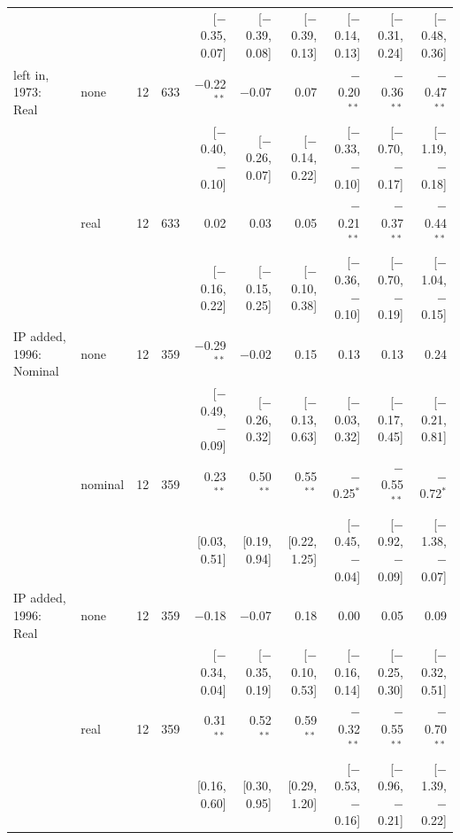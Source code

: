 \begin{table}[tp]
{\begin{tabular}{llcrrrrrrr}
 & & & & {\scriptsize [$-$0.35, 0.07]} & {\scriptsize [$-$0.39, 0.08]} & {\scriptsize [$-$0.39, 0.13]} & {\scriptsize [$-$0.14, 0.13]} & {\scriptsize [$-$0.31, 0.24]} & {\scriptsize [$-$0.48, 0.36]}\\
\addlinespace
2020 left in, 1973: Real & none & 12 & 633 & $-$0.22$^{**}$ & $-$0.07 & 0.07 & $-$0.20$^{**}$ & $-$0.36$^{**}$ & $-$0.47$^{**}$\\
 & & & & {\scriptsize [$-$0.40, $-$0.10]} & {\scriptsize [$-$0.26, 0.07]} & {\scriptsize [$-$0.14, 0.22]} & {\scriptsize [$-$0.33, $-$0.10]} & {\scriptsize [$-$0.70, $-$0.17]} & {\scriptsize [$-$1.19, $-$0.18]}\\
 & real & 12 & 633 & 0.02 & 0.03 & 0.05 & $-$0.21$^{**}$ & $-$0.37$^{**}$ & $-$0.44$^{**}$\\
 & & & & {\scriptsize [$-$0.16, 0.22]} & {\scriptsize [$-$0.15, 0.25]} & {\scriptsize [$-$0.10, 0.38]} & {\scriptsize [$-$0.36, $-$0.10]} & {\scriptsize [$-$0.70, $-$0.19]} & {\scriptsize [$-$1.04, $-$0.15]}\\
\addlinespace
IP added, 1996: Nominal & none & 12 & 359 & $-$0.29$^{**}$ & $-$0.02 & 0.15 & 0.13 & 0.13 & 0.24\\
 & & & & {\scriptsize [$-$0.49, $-$0.09]} & {\scriptsize [$-$0.26, 0.32]} & {\scriptsize [$-$0.13, 0.63]} & {\scriptsize [$-$0.03, 0.32]} & {\scriptsize [$-$0.17, 0.45]} & {\scriptsize [$-$0.21, 0.81]}\\
 & nominal & 12 & 359 & 0.23$^{**}$ & 0.50$^{**}$ & 0.55$^{**}$ & $-$0.25$^{*}$ & $-$0.55$^{**}$ & $-$0.72$^{*}$\\
 & & & & {\scriptsize [0.03, 0.51]} & {\scriptsize [0.19, 0.94]} & {\scriptsize [0.22, 1.25]} & {\scriptsize [$-$0.45, $-$0.04]} & {\scriptsize [$-$0.92, $-$0.09]} & {\scriptsize [$-$1.38, $-$0.07]}\\
\addlinespace
IP added, 1996: Real & none & 12 & 359 & $-$0.18 & $-$0.07 & 0.18 & 0.00 & 0.05 & 0.09\\
 & & & & {\scriptsize [$-$0.34, 0.04]} & {\scriptsize [$-$0.35, 0.19]} & {\scriptsize [$-$0.10, 0.53]} & {\scriptsize [$-$0.16, 0.14]} & {\scriptsize [$-$0.25, 0.30]} & {\scriptsize [$-$0.32, 0.51]}\\
 & real & 12 & 359 & 0.31$^{**}$ & 0.52$^{**}$ & 0.59$^{**}$ & $-$0.32$^{**}$ & $-$0.55$^{**}$ & $-$0.70$^{**}$\\
 & & & & {\scriptsize [0.16, 0.60]} & {\scriptsize [0.30, 0.95]} & {\scriptsize [0.29, 1.20]} & {\scriptsize [$-$0.53, $-$0.16]} & {\scriptsize [$-$0.96, $-$0.21]} & {\scriptsize [$-$1.39, $-$0.22]}\\

\end{tabular}}
\end{table}
